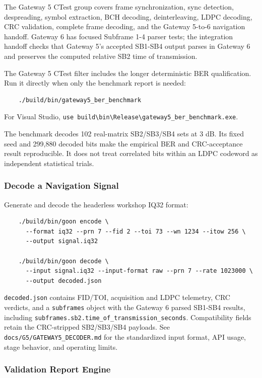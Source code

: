 \documentclass{article}
\begin{document}
The Gateway 5 CTest group covers frame synchronization, sync detection, despreading, symbol extraction, BCH decoding, deinterleaving, LDPC decoding, CRC validation, complete frame decoding, and the Gateway 5-to-6 navigation handoff. Gateway 6 has focused Subframe 1-4 parser tests; the integration handoff checks that Gateway 5's accepted SB1-SB4 output parses in Gateway 6 and preserves the computed relative SB2 time of transmission.

The Gateway 5 CTest filter includes the longer deterministic BER qualification. Run it directly when only the benchmark report is needed:
\begin{verbatim}
    ./build/bin/gateway5_ber_benchmark
\end{verbatim}
For Visual Studio, \verb|use build\bin\Release\gateway5_ber_benchmark.exe|.

The benchmark decodes 102 real-matrix SB2/SB3/SB4 sets at 3 dB. Its fixed seed and 299,880 decoded bits make the empirical BER and CRC-acceptance result reproducible. It does not treat correlated bits within an LDPC codeword as independent statistical trials.

\newpage

\subsubsection*{Decode a Navigation Signal}

Generate and decode the headerless workshop IQ32 format:
\begin{verbatim}
    ./build/bin/goon encode \
      --format iq32 --prn 7 --fid 2 --toi 73 --wn 1234 --itow 256 \
      --output signal.iq32
    
    ./build/bin/goon decode \
      --input signal.iq32 --input-format raw --prn 7 --rate 1023000 \
      --output decoded.json
\end{verbatim}
\verb|decoded.json| contains FID/TOI, acquisition and LDPC telemetry, CRC verdicts, and a \verb|subframes| object with the Gateway 6 parsed SB1-SB4 results, including \verb|subframes.sb2.time_of_transmission_seconds|. Compatibility fields retain the CRC-stripped SB2/SB3/SB4 payloads. See \verb|docs/G5/GATEWAY5_DECODER.md| for the standardized input format, API usage, stage behavior, and operating limits.

\subsubsection*{Validation Report Engine}
\end{document}
